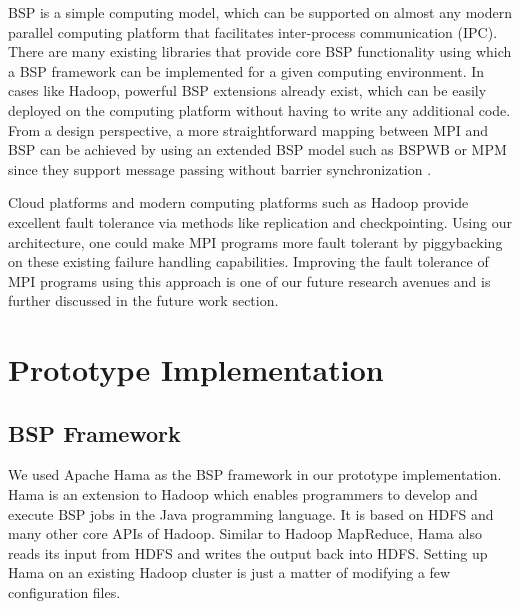 \documentclass[conference,10pt] {IEEEtran}
\begin{document}
BSP is a simple computing model, which can be supported on almost any modern parallel computing platform that facilitates inter-process communication (IPC). There are many existing libraries that provide core BSP functionality using which a BSP framework can be implemented for a given computing environment. In cases like Hadoop, powerful BSP extensions already exist, which can be easily deployed on the computing platform without having to write any additional code. From a design perspective, a more straightforward mapping between MPI and BSP can be achieved by using an extended BSP model such as BSPWB or MPM since they support message passing without barrier synchronization \cite{Roda:1998:BSP:945406.938371}.

Cloud platforms and modern computing platforms such as Hadoop provide excellent fault tolerance via methods like replication and checkpointing. Using our architecture, one could make MPI programs more fault tolerant by piggybacking on these existing failure handling capabilities. Improving the fault tolerance of MPI programs using this approach is one of our future research avenues and is further discussed in the future work section.

\section{Prototype Implementation}
\label{sec:impl}

\subsection{BSP Framework}
We used Apache Hama \cite{url:hama} as the BSP framework in our prototype implementation. Hama is an extension to Hadoop which enables programmers to develop and execute BSP jobs in the Java programming language. It is based on HDFS and many other core APIs of Hadoop. Similar to Hadoop MapReduce, Hama also reads its input from HDFS and writes the output back into HDFS. Setting up Hama on an existing Hadoop cluster is just a matter of modifying a few configuration files.
\end{document}
